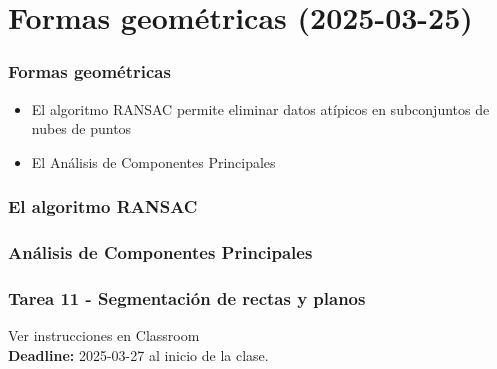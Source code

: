 \section{Formas geométricas (2025-03-25)}

\begin{frame}\frametitle{Formas geométricas}
  \begin{itemize}
  \item El algoritmo RANSAC permite eliminar datos atípicos en subconjuntos de nubes de puntos
  \item El Análisis de Componentes Principales 
  \end{itemize}
\end{frame}

\begin{frame}\frametitle{El algoritmo RANSAC}
\end{frame}

\begin{frame}\frametitle{Análisis de Componentes Principales}
\end{frame}

\begin{frame}[containsverbatim]\frametitle{Tarea 11 - Segmentación de rectas y planos}
  Ver instrucciones en Classroom
  \[\]
  \textbf{Deadline: } 2025-03-27 al inicio de la clase. 
\end{frame}
